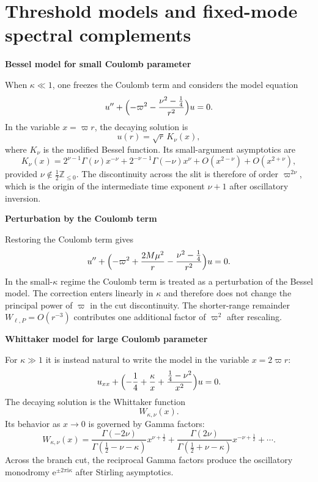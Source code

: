 \documentclass[12pt]{article}
\numberwithin{equation}{section}
\theoremstyle{plain}
\theoremstyle{definition}
\theoremstyle{remark}
\newcommand{\Z}{\mathbb Z}
\newcommand{\ii}{\mathrm i}
\newcommand{\ee}{\mathrm e}
\newcommand{\vp}{\varpi}
\newcommand{\kap}{\kappa}
\newcommand{\appheading}[1]{\par\medskip\noindent\textbf{#1}\par\smallskip\noindent}
\begin{document}
\section{Threshold models and fixed-mode spectral complements}\label{app:special_functions}
\appheading{Bessel model for small Coulomb parameter}

When $\kap\ll1$, one freezes the Coulomb term and considers the model equation
\begin{equation}\label{eq:app_bessel_model}
   u''+\Bigl(-\vp^2-\frac{\nu^2-\frac14}{r^2}\Bigr)u=0.
\end{equation}
In the variable $x=\vp r$, the decaying solution is
\[
   u(r)=\sqrt{r}\,K_\nu(x),
\]
where $K_\nu$ is the modified Bessel function.  Its small-argument asymptotics are
\begin{equation}\label{eq:app_bessel_small}
   K_\nu(x)
   =
   2^{\nu-1}\Gamma(\nu)x^{-\nu}
   +
   2^{-\nu-1}\Gamma(-\nu)x^{\nu}
   +O(x^{2-\nu})+O(x^{2+\nu}),
\end{equation}
provided $\nu\notin\frac12\Z_{\le0}$.  The discontinuity across the slit is therefore of order $\vp^{2\nu}$, which is the origin of the intermediate time exponent $\nu+1$ after oscillatory inversion.

\appheading{Perturbation by the Coulomb term}

Restoring the Coulomb term gives
\[
   u''+\Bigl(-\vp^2+\frac{2M\mu^2}{r}-\frac{\nu^2-\frac14}{r^2}\Bigr)u=0.
\]
In the small-$\kap$ regime the Coulomb term is treated as a perturbation of the Bessel model.  The correction enters linearly in $\kap$ and therefore does not change the principal power of $\vp$ in the cut discontinuity.  The shorter-range remainder $W_{\ell,P}=O(r^{-3})$ contributes one additional factor of $\vp^2$ after rescaling.

\appheading{Whittaker model for large Coulomb parameter}

For $\kap\gg1$ it is instead natural to write the model in the variable $x=2\vp r$:
\begin{equation}\label{eq:app_whittaker_model}
   u_{xx}+\Bigl(-\frac14+\frac{\kap}{x}+\frac{\frac14-\nu^2}{x^2}\Bigr)u=0.
\end{equation}
The decaying solution is the Whittaker function
\[
   W_{\kap,\nu}(x).
\]
Its behavior as $x\to0$ is governed by Gamma factors:
\begin{equation}\label{eq:app_whittaker_small}
   W_{\kap,\nu}(x)
   =
   \frac{\Gamma(-2\nu)}{\Gamma(\frac12-\nu-\kap)}x^{\nu+\frac12}
   +
   \frac{\Gamma(2\nu)}{\Gamma(\frac12+\nu-\kap)}x^{-\nu+\frac12}
   +\cdots.
\end{equation}
Across the branch cut, the reciprocal Gamma factors produce the oscillatory monodromy $\ee^{\pm2\pi\ii\kap}$ after Stirling asymptotics.
\end{document}
